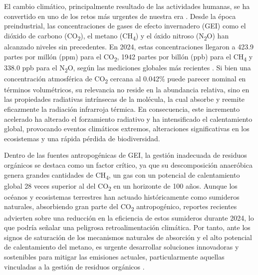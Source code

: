 El cambio climático, principalmente resultado de las actividades humanas, se ha convertido en uno de los retos más urgentes de nuestra era \parencite{allanSummaryPolicymakers2023}. Desde la época preindustrial, las concentraciones de gases de efecto invernadero (GEI) como el dióxido de carbono (CO\textsubscript{2}), el metano (CH\textsubscript{4}) y el óxido nitroso (N\textsubscript{2}O) han alcanzado niveles sin precedentes. En 2024, estas concentraciones llegaron a 423.9 partes por millón (ppm) para el CO\textsubscript{2}, 1942 partes por billón (ppb) para el CH\textsubscript{4} y 338.0 ppb para el N\textsubscript{2}O, según las mediciones globales más recientes \parencite{wmoWMOGreenhouseGas2025}. Si bien una concentración atmosférica de CO\textsubscript{2} cercana al 0.042\% puede parecer nominal en términos volumétricos, su relevancia no reside en la abundancia relativa, sino en las propiedades radiativas intrínsecas de la molécula, la cual absorbe y reemite eficazmente la radiación infrarroja térmica. En consecuencia, este incremento acelerado ha alterado el forzamiento radiativo y ha intensificado el calentamiento global, provocando eventos climáticos extremos, alteraciones significativas en los ecosistemas y una rápida pérdida de biodiversidad. 

Dentro de las fuentes antropogénicas de GEI, la gestión inadecuada de residuos orgánicos se destaca como un factor crítico, ya que su descomposición anaeróbica genera grandes cantidades de CH\textsubscript{4}, un gas con un potencial de calentamiento global 28 veces superior al del CO\textsubscript{2} en un horizonte de 100 años. Aunque los océanos y ecosistemas terrestres han actuado históricamente como sumideros naturales, absorbiendo gran parte del CO\textsubscript{2} antropogénico, reportes recientes advierten sobre una reducción en la eficiencia de estos sumideros durante 2024, lo que podría señalar una peligrosa retroalimentación climática. Por tanto, ante los signos de saturación de los mecanismos naturales de absorción y el alto potencial de calentamiento del metano, es urgente desarrollar soluciones innovadoras y sostenibles para mitigar las emisiones actuales, particularmente aquellas vinculadas a la gestión de residuos orgánicos \parencite{ginerFoodLossWaste2025a}.

